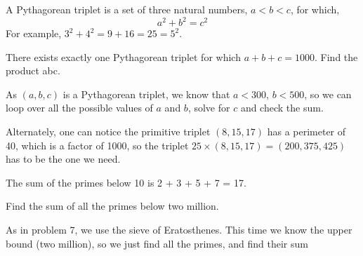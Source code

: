 


 A Pythagorean triplet is a set of three natural numbers, $a < b < c$, for which,
$$a^2 + b^2 = c^2$$
For example, $3^2 + 4^2 = 9 + 16 = 25 = 5^2$.

There exists exactly one Pythagorean triplet for which $a + b + c = 1000$.
Find the product abc.

 As $(a,b,c)$ is a Pythagorean triplet, we know that $a < 300$, $b < 500$, so we can loop
over all the possible values of $a$ and $b$, solve for $c$ and check the sum.

Alternately, one can notice the primitive triplet $(8,15,17)$ has a perimeter of 40, which is a factor of
1000, so the triplet $25\times(8,15,17) = (200, 375, 425)$ has to be the one we need.




The sum of the primes below 10 is 2 + 3 + 5 + 7 = 17.

Find the sum of all the primes below two million.

As in problem 7, we use the sieve of Eratosthenes.  This time we know the upper bound (two million),
so we just find all the primes, and find their sum



